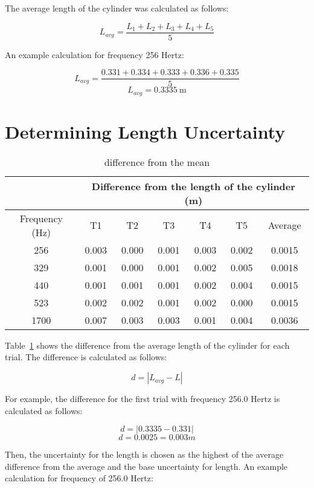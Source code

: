 \documentclass{article}
\begin{document}
The average length of the cylinder was calculated as follows:

\[L_{avg}=\frac{L_1+L_2+L_3+L_4+L_5}{5}\]

An example calculation for frequency 256 Hertz:

\[L_{avg}=\frac{0.331+0.334+0.333+0.336+0.335}{5}\]
\[L_{avg}=\SI{0.3335}{\metre}\]

\section{Determining Length Uncertainty}

\begin{table}[H]
  \centering
  \begin{tabular}{@{}ccccccc@{}}
    \toprule
    & \multicolumn{6}{c}{Difference from the length of the cylinder
    (m)} \\ \midrule
    Frequency (Hz) & T1        & T2       & T3       & T4       & T5
    & Average    \\
    256            & 0.003     & 0.000    & 0.001    & 0.003    &
    0.002    & 0.0015     \\
    329            & 0.001     & 0.000    & 0.001    & 0.002    &
    0.005    & 0.0018     \\
    440            & 0.001     & 0.001    & 0.001    & 0.002    &
    0.004    & 0.0015     \\
    523            & 0.002     & 0.002    & 0.001    & 0.002    &
    0.000    & 0.0015     \\
    1700           & 0.007     & 0.003    & 0.003    & 0.001    &
    0.004    & 0.0036     \\ \bottomrule
  \end{tabular}
  \caption{difference from the mean}\label{tab:diff-from-mean}
\end{table}

Table~\ref{tab:diff-from-mean} shows the difference from the average
length of the cylinder
for each trial. The difference is calculated as follows:

\[d=|L_{avg}-L|\]

For example, the difference for the first trial with frequency 256.0
Hertz is calculated as follows:

\[d=|0.3335-0.331|\]
\[d=0.0025=0.003 m\]

Then, the uncertainty for the length is chosen as the highest of the
average difference from the average and the base uncertainty for
length. An example calculation for frequency of 256.0 Hertz:
\end{document}
